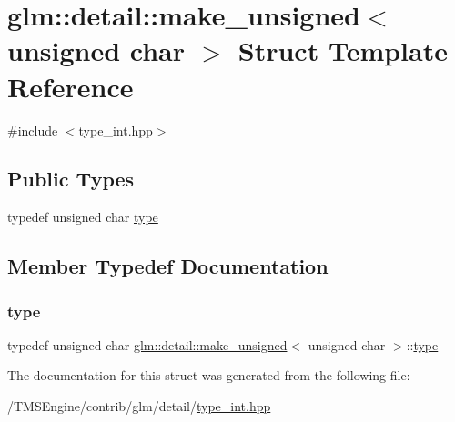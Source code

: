 \hypertarget{structglm_1_1detail_1_1make__unsigned_3_01unsigned_01char_01_4}{}\section{glm\+:\+:detail\+:\+:make\+\_\+unsigned$<$ unsigned char $>$ Struct Template Reference}
\label{structglm_1_1detail_1_1make__unsigned_3_01unsigned_01char_01_4}


{\ttfamily \#include $<$type\+\_\+int.\+hpp$>$}

\subsection*{Public Types}
\begin{DoxyCompactItemize}
\item 
typedef unsigned char \hyperlink{structglm_1_1detail_1_1make__unsigned_3_01unsigned_01char_01_4_a783a55dc0559d4b972a0d85cf08256f2}{type}
\end{DoxyCompactItemize}


\subsection{Member Typedef Documentation}
\mbox{\label{structglm_1_1detail_1_1make__unsigned_3_01unsigned_01char_01_4_a783a55dc0559d4b972a0d85cf08256f2}} 
\subsubsection{\texorpdfstring{type}{type}}
{\footnotesize\ttfamily typedef unsigned char \hyperlink{structglm_1_1detail_1_1make__unsigned}{glm\+::detail\+::make\+\_\+unsigned}$<$ unsigned char $>$\+::\hyperlink{structglm_1_1detail_1_1make__unsigned_3_01unsigned_01char_01_4_a783a55dc0559d4b972a0d85cf08256f2}{type}}



The documentation for this struct was generated from the following file\+:\begin{DoxyCompactItemize}
\item 
/\+T\+M\+S\+Engine/contrib/glm/detail/\hyperlink{type__int_8hpp}{type\+\_\+int.\+hpp}\end{DoxyCompactItemize}
